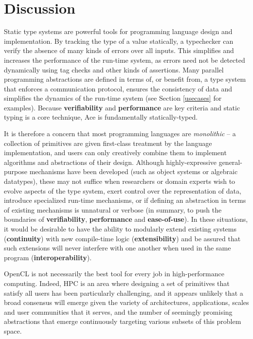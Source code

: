 \documentclass[9pt,preprint]{sigplanconf}
\begin{document}
\section{Discussion}\label{discussion}
Static type systems are powerful tools for programming language design and implementation. By tracking the type of a value statically, a typechecker can verify the absence of many kinds of errors over all inputs. This simplifies and increases the performance of the run-time system, as errors need not be detected dynamically using tag checks and other kinds of assertions. Many parallel programming abstractions are defined in terms of, or benefit from, a type system that enforces a communication protocol, ensures the consistency of data and simplifies the dynamics of the run-time system (see Section \ref{usecases} for examples). Because \textbf{verifiability} and \textbf{performance} are key criteria and static typing is a core technique, Ace is fundamentally statically-typed.

It is therefore a concern that most programming languages are {\em monolithic} -- a collection of primitives are given first-class treatment by the language implementation, and users can only creatively combine them to implement algorithms and abstractions of their design. Although highly-expressive general-purpose mechanisms have been developed (such as object systems or algebraic datatypes), these may not suffice when researchers or domain experts wish to evolve aspects of the type system, exert control over the representation of data, introduce specialized run-time mechanisms, or if defining an abstraction in terms of existing mechanisms is unnatural or verbose (in summary, to push the boundaries of \textbf{verifiability}, \textbf{performance} and \textbf{ease-of-use}). In these situations, it would be desirable to have the ability to modularly extend existing systems (\textbf{continuity}) with new compile-time logic (\textbf{extensibility}) and be assured that such extensions will never interfere with one another when used in the same program (\textbf{interoperability}).

OpenCL is not necessarily the best tool for every job in high-performance computing. Indeed, HPC is an area where designing a set of primitives that satisfy all users has been particularly challenging, and it appears unlikely that a broad consensus will emerge given the variety of architectures, applications, scales and user communities that it serves, and the number of seemingly promising abstractions that emerge continuously targeting various subsets of this problem space.
\end{document}
